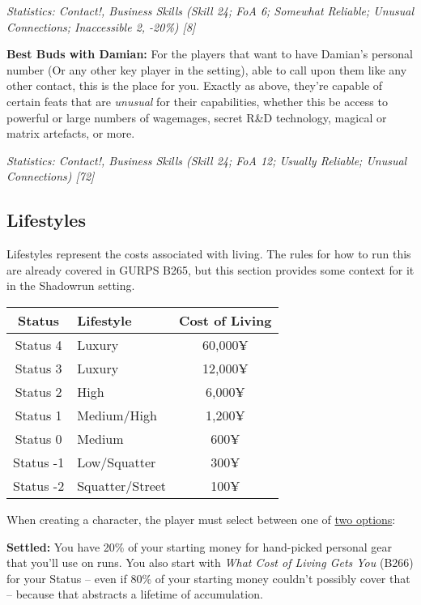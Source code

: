 \begin{multicols}{2}
	\textit{\textcolor{OliveGreen}{Statistics: Contact!, Business Skills (Skill 24; FoA 6; Somewhat Reliable; Unusual Connections; Inaccessible 2, -20\%) [8]}}
	
	\textbf{Best Buds with Damian:} For the players that want to have Damian's personal number (Or any other key player in the setting), able to call upon them like any other contact, this is the place for you. Exactly as above, they're capable of certain feats that are \textit{unusual} for their capabilities, whether this be access to powerful or large numbers of wagemages, secret R\&D technology, magical or matrix artefacts, or more.
	
	\textit{\textcolor{OliveGreen}{Statistics: Contact!, Business Skills (Skill 24; FoA 12; Usually Reliable; Unusual Connections) [72]}}
	
	\subsection{Lifestyles}
	
	Lifestyles represent the costs associated with living. The rules for how to run this are already covered in GURPS B265, but this section provides some context for it in the Shadowrun setting.
	
	\begin{center}
		\begin{tabularx}{0.49\textwidth}{|c|X|c|}
			\hline
			Status & Lifestyle & Cost of Living \\
			\hline
			\hline
			Status 4 & Luxury & 60,000¥ \\
			Status 3 & Luxury & 12,000¥ \\
			Status 2 & High & 6,000¥ \\
			Status 1 & Medium/High & 1,200¥ \\
			Status 0 & Medium & 600¥ \\
			Status -1 & Low/Squatter & 300¥ \\
			Status -2 & Squatter/Street & 100¥ \\
			\hline
		\end{tabularx}
	\end{center}
	
	When creating a character, the player must select between one of \textcolor{Blue}{\href{http://forums.sjgames.com/showpost.php?p=1792209&postcount=7}{two options}}:
	
	\textbf{Settled:} You have 20\% of your starting money for hand-picked personal gear that you'll use on runs. You also start with \textit{What Cost of Living Gets You} (B266) for your Status – even if 80\% of your starting money couldn't possibly cover that – because that abstracts a lifetime of accumulation.
	

\end{multicols}
